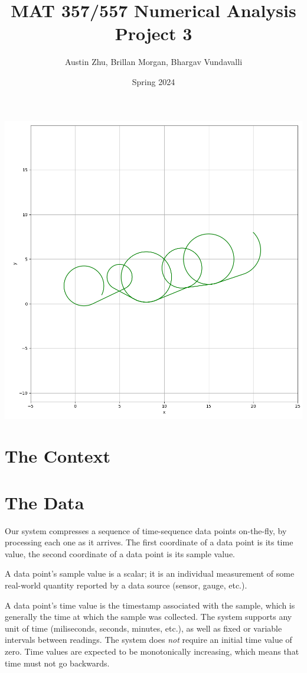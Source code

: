 \documentclass{article}
\title{MAT 357/557 Numerical Analysis Project 3}
\author{Austin Zhu, Brillan Morgan, Bhargav Vundavalli}
\date{Spring 2024}
\begin{document}
\maketitle

\begin{center}
\includegraphics[width=1.0\linewidth]{Plots/CoverPlot.png}
\newpage
\end{center}


\section{The Context}


\section{The Data}
Our system compresses a sequence of time-sequence data points on-the-fly, by processing each one as it arrives. The first coordinate of a data point is its time value, the second coordinate of a data point is its sample value.

A data point's sample value is a scalar; it is an individual measurement of some real-world quantity reported by a data source (sensor, gauge, etc.).

A data point's time value is the timestamp associated with the sample, which is generally the time at which the sample was collected. The system supports any unit of time (miliseconds, seconds, minutes, etc.), as well as fixed or variable intervals between readings. The system does \textit{not} require an initial time value of zero. Time values are expected to be monotonically increasing, which means that time must not go backwards.
\end{document}
